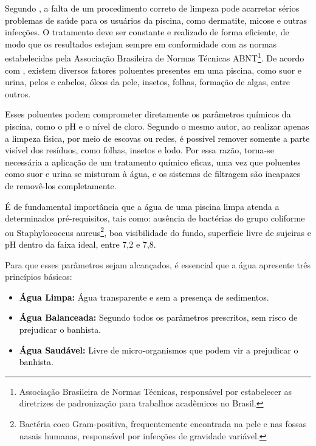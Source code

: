        \textcolor{black}{Segundo \cite{piscineiroProfissional}, a falta de um procedimento correto de limpeza pode acarretar sérios problemas de saúde para os usuários da piscina, como dermatite, micose e outras infecções. O tratamento deve ser constante e realizado de forma eficiente, de modo que os resultados estejam sempre em conformidade com as normas estabelecidas pela Associação Brasileira de Normas Técnicas ABNT\footnote{Associação Brasileira de Normas Técnicas, responsável por estabelecer as diretrizes de padronização para trabalhos acadêmicos no Brasil.}. De acordo com \cite{guiaTratamento}, existem diversos fatores poluentes presentes em uma piscina, como suor e urina, pelos e cabelos, óleos da pele, insetos, folhas, formação de algas, entre outros.}

       \textcolor{black}{Esses poluentes podem comprometer diretamente os parâmetros químicos da piscina, como o pH e o nível de cloro. Segundo o mesmo autor, ao realizar apenas a limpeza física, por meio de escovas ou redes, é possível remover somente a parte visível dos resíduos, como folhas, insetos e lodo. Por essa razão, torna-se necessária a aplicação de um tratamento químico eficaz, uma vez que poluentes como suor e urina se misturam à água, e os sistemas de filtragem são incapazes de removê-los completamente.}


       \textcolor{black}{É de fundamental importância que a água de uma piscina limpa atenda a determinados pré-requisitos, tais como: ausência de bactérias do grupo coliforme ou Staphylococcus aureus\footnote{Bactéria coco Gram-positiva, frequentemente encontrada na pele e nas fossas nasais humanas, responsável por infecções de gravidade variável.}, boa visibilidade do fundo, superfície livre de sujeiras e pH dentro da faixa ideal, entre 7,2 e 7,8.}

       Para que esses parâmetros sejam alcançados, é essencial que a água apresente três princípios básicos:
    
       \begin{itemize}
            \item \textbf{\textcolor{black}{Água Limpa:}} \textcolor{black}{Água transparente e sem a presença de sedimentos.}
            
            \item \textbf{\textcolor{black}{Água Balanceada:}} \textcolor{black}{Segundo todos os parâmetros prescritos, sem risco de prejudicar o banhista.}
             
            \item \textbf{\textcolor{black}{Água Saudável:}} \textcolor{black}{Livre de micro-organismos que podem vir a prejudicar o banhista.}
            
        \end{itemize}

